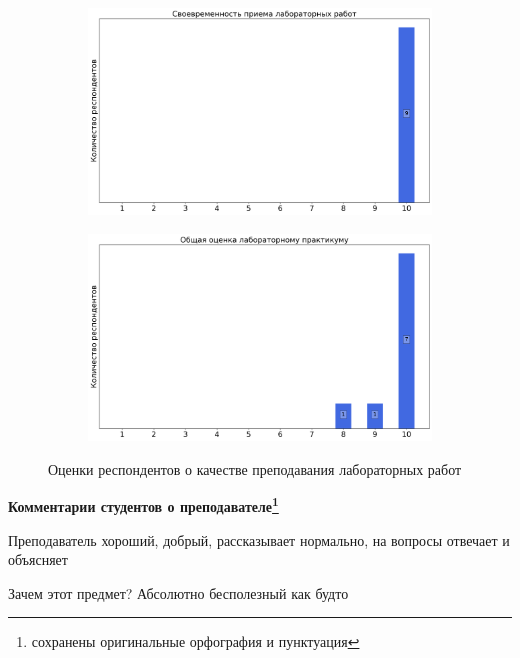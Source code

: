 \begin{figure}[H]
\begin{subfigure}[b]{0.45\textwidth}
                \includegraphics[width=\textwidth]{images/3 course/Радиофизическая лаборатория/labniks-marks-Борисов Д.А.-2.png}
            \end{subfigure}
            \begin{subfigure}[b]{0.45\textwidth}
                \centering
                \includegraphics[width=\textwidth]{images/3 course/Радиофизическая лаборатория/labniks-marks-Борисов Д.А.-3.png}
            \end{subfigure}	
            \caption{Оценки респондентов о качестве преподавания лабораторных работ}
        \end{figure}

        \textbf{Комментарии студентов о преподавателе\protect\footnote{сохранены оригинальные орфография и пунктуация}}
            \begin{commentbox} 
                Преподаватель хороший, добрый, рассказывает нормально, на вопросы отвечает и объясняет

                Зачем этот предмет? Абсолютно бесполезный как будто 
            \end{commentbox} 
        

